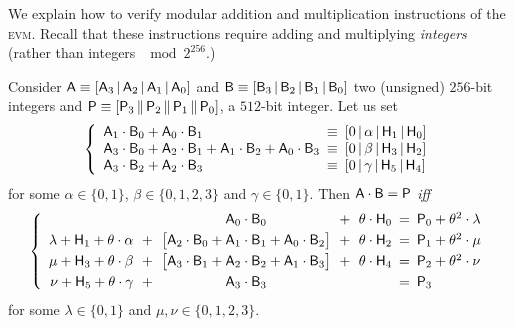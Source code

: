 We explain how to verify modular addition and multiplication instructions of the \textsc{evm}. Recall that these instructions require adding and multiplying \emph{integers} (rather than integers $\mod 2^{256}$.)
\begin{lem}
	Consider
	$\mathsf{A}\equiv [\mathsf{A}_{3} \,|\, \mathsf{A}_{2} \,|\, \mathsf{A}_{1} \,|\, \mathsf{A}_{0}]$ and 
	$\mathsf{B}\equiv [\mathsf{B}_{3} \,|\, \mathsf{B}_{2} \,|\, \mathsf{B}_{1} \,|\, \mathsf{B}_{0}]$ two (unsigned) $256$-bit integers
	and 
	$\mathsf{P}\equiv [\mathsf{P}_{3} \,\|\, \mathsf{P}_{2} \,\|\, \mathsf{P}_{1} \,\|\, \mathsf{P}_{0}]$,
	a $512$-bit integer. Let us set
	\[
		\left\{ \begin{array}{lcl}
			\colm{A}_{1}\cdot\colm{B}_{0} + \colm{A}_{0}\cdot\colm{B}_{1}                                                                 & \!\!\! \equiv \!\!\! & [0 \,|\, \alpha \,|\, \colm{H}_{1} \,|\, \colm{H}_{0}]\\
			\colm{A}_{3}\cdot\colm{B}_{0} + \colm{A}_{2}\cdot\colm{B}_{1} + \colm{A}_{1}\cdot\colm{B}_{2} + \colm{A}_{0}\cdot\colm{B}_{3} & \!\!\! \equiv \!\!\! & [0 \,|\, \beta \,|\, \colm{H}_{3} \,|\, \colm{H}_{2}]\\
			\colm{A}_{3}\cdot\colm{B}_{2} + \colm{A}_{2}\cdot\colm{B}_{3}                                                                 & \!\!\! \equiv \!\!\! & [0 \,|\, \gamma \,|\, \colm{H}_{5} \,|\, \colm{H}_{4}]\\
		\end{array} \right.
	\]
	for some
	$\alpha \in \{ 0, 1 \}$,
	$\beta \in \{ 0, 1, 2, 3 \}$
	and 
	$\gamma \in \{ 0, 1 \}$. Then $\mathsf{A} \cdot \mathsf{B} = \mathsf{P}$ \emph{iff}
	\[
		\left\{ \begin{array}{rccclcl}
			&& \colm{A}_{0}\cdot\colm{B}_{0} & \!\!\!\! + \!\!\!\! & \theta \cdot \colm{H}_{0}
			& \!\!\! = \!\!\! &
			\colm{P}_{0} + \theta^2 \cdot \lambda
			\vspace{1mm} \\
			\lambda + \colm{H}_{1} + \theta \cdot \alpha & \!\!\!\! + \!\!\!\! & \big[\colm{A}_{2}\cdot\colm{B}_{0} + \colm{A}_{1}\cdot\colm{B}_{1} + \colm{A}_{0}\cdot\colm{B}_{2} \big] & \!\!\!\! + \!\!\!\! & \theta \cdot \colm{H}_{2}
			& \!\!\! = \!\!\! &
			\colm{P}_{1} + \theta^2 \cdot \mu
			\vspace{1mm} \\
			\mu + \colm{H}_{3} + \theta \cdot \beta & \!\!\!\! + \!\!\!\! & \big[\colm{A}_{3}\cdot\colm{B}_{1} + \colm{A}_{2}\cdot\colm{B}_{2} + \colm{A}_{1}\cdot\colm{B}_{3} \big] & \!\!\!\! + \!\!\!\! & \theta \cdot \colm{H}_{4}
			& \!\!\! = \!\!\! &
			\colm{P}_{2} + \theta^2 \cdot \nu
			\vspace{1mm} \\
			\nu + \colm{H}_{5} + \theta \cdot \gamma & \!\!\!\! + \!\!\!\! & \colm{A}_{3}\cdot\colm{B}_{3} & & 
			& \!\!\! = \!\!\! &
			\colm{P}_{3}
			\\
		\end{array} \right.
	\]
	for some
	$\lambda \in \{0, 1\}$
	and 
	$\mu, \nu \in \{0, 1, 2, 3\}$.
\end{lem}
